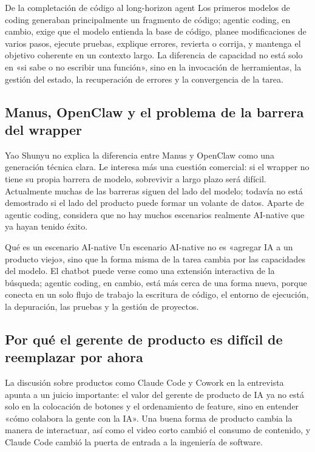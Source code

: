 \documentclass[a4paper]{article}
\begin{document}
\begin{importantbox}{De la completación de código al long-horizon agent}
Los primeros modelos de coding generaban principalmente un fragmento de código; agentic coding, en cambio, exige que el modelo entienda la base de código, planee modificaciones de varios pasos, ejecute pruebas, explique errores, revierta o corrija, y mantenga el objetivo coherente en un contexto largo. La diferencia de capacidad no está solo en «si sabe o no escribir una función», sino en la invocación de herramientas, la gestión del estado, la recuperación de errores y la convergencia de la tarea.
\end{importantbox}

\subsection{Manus, OpenClaw y el problema de la barrera del wrapper}

Yao Shunyu no explica la diferencia entre Manus y OpenClaw como una generación técnica clara. Le interesa más una cuestión comercial: si el wrapper no tiene su propia barrera de modelo, sobrevivir a largo plazo será difícil. Actualmente muchas de las barreras siguen del lado del modelo; todavía no está demostrado si el lado del producto puede formar un volante de datos. Aparte de agentic coding, considera que no hay muchos escenarios realmente AI-native que ya hayan tenido éxito.

\begin{knowledgebox}{Qué es un escenario AI-native}
Un escenario AI-native no es «agregar IA a un producto viejo», sino que la forma misma de la tarea cambia por las capacidades del modelo. El chatbot puede verse como una extensión interactiva de la búsqueda; agentic coding, en cambio, está más cerca de una forma nueva, porque conecta en un solo flujo de trabajo la escritura de código, el entorno de ejecución, la depuración, las pruebas y la gestión de proyectos.
\end{knowledgebox}

\subsection{Por qué el gerente de producto es difícil de reemplazar por ahora}

La discusión sobre productos como Claude Code y Cowork en la entrevista apunta a un juicio importante: el valor del gerente de producto de IA ya no está solo en la colocación de botones y el ordenamiento de feature, sino en entender «cómo colabora la gente con la IA». Una buena forma de producto cambia la manera de interactuar, así como el video corto cambió el consumo de contenido, y Claude Code cambió la puerta de entrada a la ingeniería de software.
\end{document}
